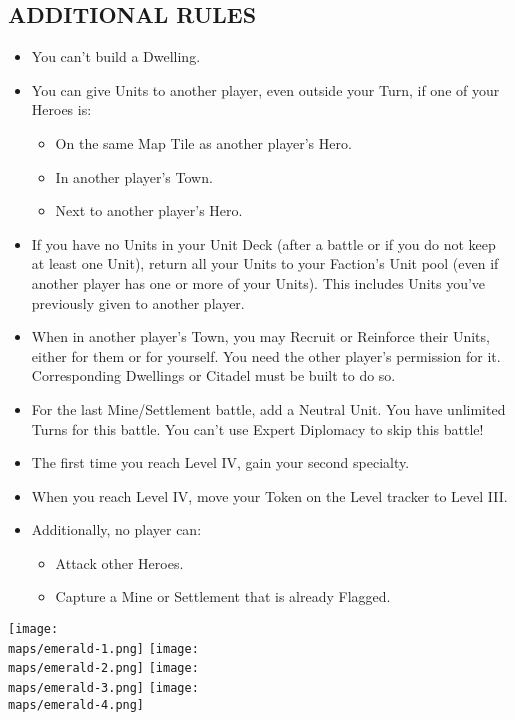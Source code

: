 \begin{multicols*}{2}
\subsection*{\MakeUppercase{Additional Rules}}
\begin{itemize}
    \item You can't build a  Dwelling.
    \item You can give Units to another player, even outside your Turn, if one of your Heroes is:
    \begin{itemize}
        \item On the same Map Tile as another player's Hero.
        \item In another player's Town.
        \item Next to another player's Hero.
    \end{itemize}
    \item If you have no Units in your Unit Deck (after a battle or if you do not keep at least one Unit), return all your Units to your Faction's Unit pool (even if another player has one or more of your Units). This includes Units you've previously given to another player.
    \item When in another player's Town, you may Recruit or Reinforce their Units, either for them or for yourself. You need the other player's permission for it. Corresponding Dwellings or Citadel must be built to do so.
    \item For the last Mine/Settlement battle, add a  Neutral Unit. You have unlimited Turns for this battle. You can't use Expert Diplomacy to skip this battle!
    \item The first time you reach Level IV, gain your second specialty.
    \item When you reach Level IV, move your Token on the Level tracker to Level III.
    \item Additionally, no player can:
    \begin{itemize}
        \item Attack other Heroes.
        \item Capture a Mine or Settlement that is already Flagged.
    \end{itemize}
\end{itemize}

\vspace{2em}

\begin{center}
  \texttt{[image: \\maps/emerald-1.png]}
  \vspace{3em}
  \texttt{[image: \\maps/emerald-2.png]}
  \vspace{3em}
  \texttt{[image: \\maps/emerald-3.png]}
  \vspace{3em}
  \texttt{[image: \\maps/emerald-4.png]}
\end{center}

\end{multicols*}
